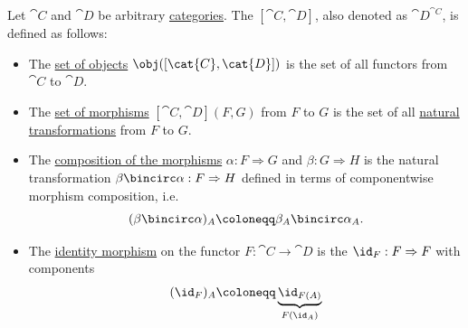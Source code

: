 \begin{definition}\label{def:functor_category}
  Let \( \cat{C} \) and \( \cat{D} \) be arbitrary \hyperref[def:category]{categories}. The  \( [\cat{C}, \cat{D}] \), also denoted as \( \cat{D}^{\cat{C}} \), is defined as follows:

  \begin{itemize}
    \item The \hyperref[def:category/objects]{set of objects} \( \obj([\cat{C}, \cat{D}]) \) is the set of all functors from \( \cat{C} \) to \( \cat{D} \).

    \item The \hyperref[def:category/morphisms]{set of morphisms} \( [\cat{C}, \cat{D}](F, G) \) from \( F \) to \( G \) is the set of all \hyperref[def:natural_transformation]{natural transformations} from \( F \) to \( G \).

    \item The \hyperref[def:category/composition]{composition of the morphisms} \( \alpha: F \Rightarrow G \) and \( \beta: G \Rightarrow H \) is the natural transformation \( \beta \bincirc \alpha: F \Rightarrow H \) defined in terms of componentwise morphism composition, i.e.
    \begin{equation}\label{eq:def:functor_category/composition}
      (\beta \bincirc \alpha)_A \coloneqq \beta_A \bincirc \alpha_A.
    \end{equation}

    \item The \hyperref[def:category/identity]{identity morphism} on the functor \( F: \cat{C} \to \cat{D} \) is the  \( \id_F: F \Rightarrow F \) with components
    \begin{equation}\label{eq:def:functor_category/identity}
      (\id_F)_A \coloneqq \underbrace{\id_{F(A)}}_{F(\id_A)}
    \end{equation}
  \end{itemize}
\end{definition}
